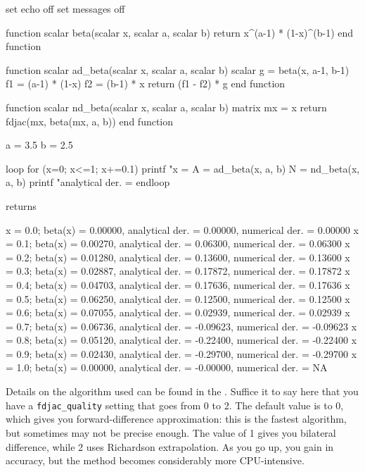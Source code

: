 \begin{code}
set echo off
set messages off

function scalar beta(scalar x, scalar a, scalar b)
    return x^(a-1) * (1-x)^(b-1)
end function

function scalar ad_beta(scalar x, scalar a, scalar b)
    scalar g = beta(x, a-1, b-1)
    f1 = (a-1) * (1-x)
    f2 = (b-1) * x
    return (f1 - f2) * g
end function

function scalar nd_beta(scalar x, scalar a, scalar b)
    matrix mx = {x}
    return fdjac(mx, beta(mx, a, b))
end function

a = 3.5
b = 2.5

loop for (x=0; x<=1; x+=0.1)
    printf "x = %
    A = ad_beta(x, a, b)
    N = nd_beta(x, a, b)
    printf "analytical der. = %
endloop
\end{code}

returns 

\begin{code}
x = 0.0; beta(x) = 0.00000, analytical der. =  0.00000, numerical der. =  0.00000
x = 0.1; beta(x) = 0.00270, analytical der. =  0.06300, numerical der. =  0.06300
x = 0.2; beta(x) = 0.01280, analytical der. =  0.13600, numerical der. =  0.13600
x = 0.3; beta(x) = 0.02887, analytical der. =  0.17872, numerical der. =  0.17872
x = 0.4; beta(x) = 0.04703, analytical der. =  0.17636, numerical der. =  0.17636
x = 0.5; beta(x) = 0.06250, analytical der. =  0.12500, numerical der. =  0.12500
x = 0.6; beta(x) = 0.07055, analytical der. =  0.02939, numerical der. =  0.02939
x = 0.7; beta(x) = 0.06736, analytical der. = -0.09623, numerical der. = -0.09623
x = 0.8; beta(x) = 0.05120, analytical der. = -0.22400, numerical der. = -0.22400
x = 0.9; beta(x) = 0.02430, analytical der. = -0.29700, numerical der. = -0.29700
x = 1.0; beta(x) = 0.00000, analytical der. = -0.00000, numerical der. =       NA
\end{code}

Details on the algorithm used can be found in the \GCR. Suffice it to
say here that you have a \texttt{fdjac\_quality} setting that goes
from 0 to 2. The default value is to 0, which gives you
forward-difference approximation: this is the fastest algorithm, but
sometimes may not be precise enough. The value of 1 gives you
bilateral difference, while 2 uses Richardson extrapolation. As you go
up, you gain in accuracy, but the method becomes considerably more
CPU-intensive.




